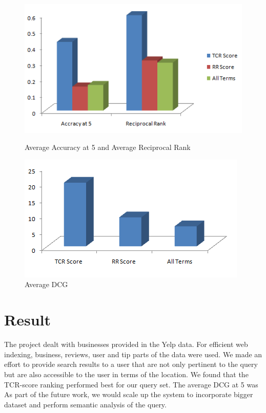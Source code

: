\documentclass[paper=letter, fontsize=15pt]{article} %
\begin{document}
\begin{figure}[h!]
\begin{minipage}{.5\linewidth}
\centering
\includegraphics[scale=0.6]{Avg.png}
\caption{Average Accuracy at 5 and Average Reciprocal Rank}
\end{minipage}
\begin{minipage}{.5\linewidth}
\centering
\includegraphics[scale=0.6]{AvgNDCG-2.png}
\caption{Average DCG}
\end{minipage}
\end{figure} 

\section{Result}
The project dealt with businesses provided in the Yelp data. For efficient web indexing, business, reviews, user and tip parts of the data were used. We made an effort to provide search results to a user that are not only pertinent to the query but are also accessible to the user in terms of the location.
We found that the TCR-score ranking performed best for our query set. The average DCG at 5 was
As part of the future work, we would scale up the system to incorporate bigger dataset and perform semantic analysis of the query.

\vspace{40mm}








      

\end{document}
